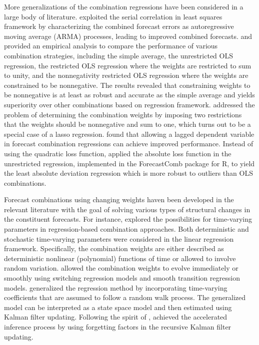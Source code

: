 \documentclass[11pt]{article}
\newcommand{\pkg}[1]{{\normalfont\fontseries{b}\selectfont #1}}
\let\proglang=\textsf
\begin{document}
More generalizations of the combination regressions have been considered in a large body of literature. \citet{Diebold1988-sx} exploited the serial correlation in least squares framework by characterizing the combined forecast errors as autoregressive moving average (ARMA) processes, leading to improved combined forecasts. \citet{Gunter1992-go} and \citet{Aksu1992-lb} provided an empirical analysis to compare the performance of various combination strategies, including the simple average, the unrestricted OLS regression, the restricted OLS regression where the weights are restricted to sum to unity, and the nonnegativity restricted OLS regression where the weights are constrained to be nonnegative. The results revealed that constraining weights to be nonnegative is at least as robust and accurate as the simple average and yields superiority over other combinations based on regression framework. \citet{Conflitti2015-fq} addressed the problem of determining the combination weights by imposing two restrictions that the weights should be nonnegative and sum to one, which turns out to be a special case of a lasso regression. \citet{Edward_Coulson1993-db} found that allowing a lagged dependent variable in forecast combination regressions can achieve improved performance. Instead of using the quadratic loss function, \citet{Nowotarski2014-ev} applied the absolute loss function in the unrestricted regression, implemented in the \pkg{ForecastComb} package for \proglang{R}, to yield the least absolute deviation regression which is more robust to outliers than OLS combinations.

Forecast combinations using changing weights haven been developed in the relevant literature with the goal of solving various types of structural changes in the constituent forecasts. For instance, \citet{Diebold1987-go} explored the possibilities for time-varying parameters in regression-based combination approaches. Both deterministic and stochastic time-varying parameters were considered in the linear regression framework. Specifically, the combination weights are either described as deterministic nonlinear (polynomial) functions of time or allowed to involve random variation. \citet{Deutsch1994-ob} allowed the combination weights to evolve immediately or smoothly using switching regression models and smooth transition regression models. \citet{Terui2002-df} generalized the regression method by incorporating time-varying coefficients that are assumed to follow a random walk process. The generalized model can be interpreted as a state space model and then estimated using Kalman filter updating. Following the spirit of \citet{Terui2002-df}, \citet{Raftery2010-qe} achieved the accelerated inference process by using forgetting factors in the recursive Kalman filter updating.
\end{document}
